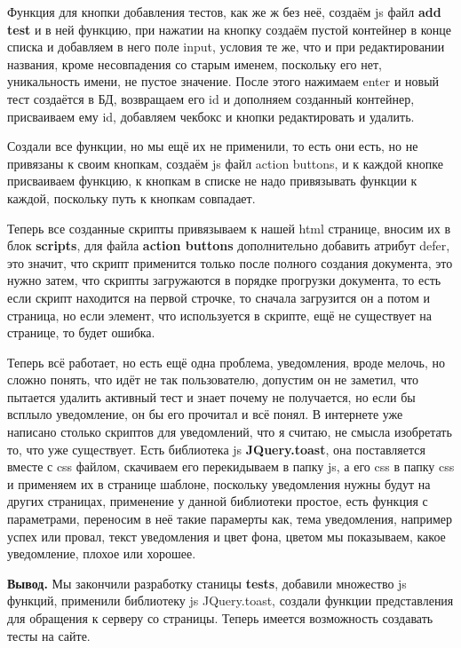 \documentclass[12pt, oldlfont, amsfonts]{report}
\begin{document}
Функция для кнопки добавления тестов, как же ж без неё, создаём js файл {\bf add test} и в ней функцию, при нажатии на кнопку создаём пустой контейнер в конце списка и добавляем в него поле input, условия те же, что и при редактировании названия, кроме несовпадения со старым именем, поскольку его нет, уникальность имени, не пустое значение. После этого нажимаем {enter} и новый тест создаётся в БД, возвращаем его id и дополняем созданный контейнер, присваиваем ему id, добавляем чекбокс и кнопки редактировать и удалить.

Создали все функции, но мы ещё их не применили, то есть они есть, но не привязаны к своим кнопкам, создаём js файл {action buttons}, и к каждой кнопке присваиваем функцию, к кнопкам в списке не надо привязывать функции к каждой, поскольку путь к кнопкам совпадает.

Теперь все созданные скрипты привязываем к нашей html странице, вносим их в блок {\bf scripts}, для файла {\bf action buttons} дополнительно добавить атрибут defer, это значит, что скрипт применится только после полного создания документа, это нужно затем, что скрипты загружаются в порядке прогрузки документа, то есть если скрипт находится на первой строчке, то сначала загрузится он а потом и страница, но если элемент, что используется в скрипте, ещё не существует на странице, то будет ошибка.

Теперь всё работает, но есть ещё одна проблема, уведомления, вроде мелочь, но сложно понять, что идёт не так пользователю, допустим он не заметил, что пытается удалить активный тест и знает почему не получается, но если бы всплыло уведомление, он бы его прочитал и всё понял. В интернете уже написано столько скриптов для уведомлений, что я считаю, не смысла изобретать то, что уже существует. Есть библиотека js {\bf JQuery.toast}, она поставляется вместе с css файлом, скачиваем его перекидываем в папку js, а его css в папку css и применяем их в странице шаблоне, поскольку уведомления нужны будут на других страницах, применение у данной библиотеки простое, есть функция с параметрами, переносим в неё такие парамерты как, тема уведомления, например успех или провал, текст уведомления и цвет фона, цветом мы показываем, какое уведомление, плохое или хорошее.

{\bf Вывод.} Мы закончили разработку станицы {\bf tests}, добавили множество js функций, применили библиотеку js {JQuery.toast}, создали функции представления для обращения к серверу со страницы. Теперь имеется возможность создавать тесты на сайте.
\end{document}
